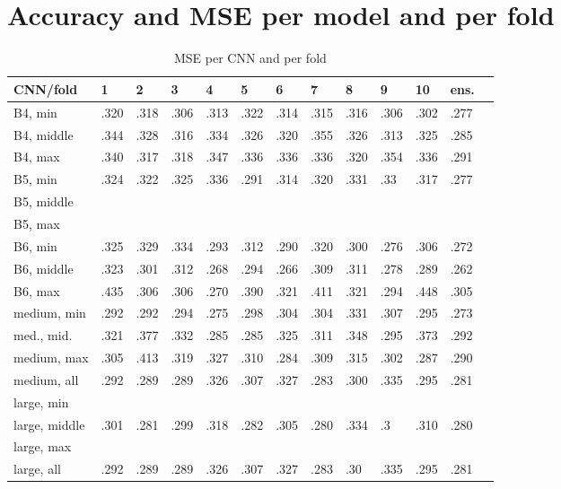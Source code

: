 \documentclass[10pt,letterpaper]{article}
\begin{document}
\section{\\Accuracy and MSE per model and per fold}

\begin{table}[!ht]
    \caption{MSE per CNN and per fold}
    \centering
    \begin{tabular}{|l|l|l|l|l|l|l|l|l|l|l|l|l|}
    \hline
        CNN/fold & 1 & 2 & 3 & 4 & 5 & 6 & 7 & 8 & 9 & 10 & ens. \\ \hline
        B4, min & .320 & .318 & .306 & .313 & .322 & .314 & .315 & .316 & .306 & .302 & .277 \\ \hline
        B4, middle & .344 & .328 & .316 & .334 & .326 & .320 & .355 & .326 & .313 & .325 & .285 \\ \hline
        B4, max & .340 & .317 & .318 & .347 & .336 & .336 & .336 & .320 & .354 & .336 & .291 \\ \hline
        B5, min & .324 & .322 & .325 & .336 & .291 & .314 & .320 & .331 & .33 & .317 & .277 \\ \hline
        B5, middle & ~ & ~ & ~ & ~ & ~ & ~ & ~ & ~ & ~ & ~ & ~ \\ \hline
        B5, max & ~ & ~ & ~ & ~ & ~ & ~ & ~ & ~ & ~ & ~ & ~ \\ \hline
        B6, min & .325 & .329 & .334 & .293 & .312 & .290 & .320 & .300 & .276 & .306 & .272 \\ \hline
        B6, middle & .323 & .301 & .312 & .268 & .294 & .266 & .309 & .311 & .278 & .289 & .262 \\ \hline
        B6, max & .435 & .306 & .306 & .270 & .390 & .321 & .411 & .321 & .294 & .448 & .305 \\ \hline
        medium, min & .292 & .292 & .294 & .275 & .298 & .304 & .304 & .331 & .307 & .295 & .273 \\ \hline
        med., mid. & .321 & .377 & .332 & .285 & .285 & .325 & .311 & .348 & .295 & .373 & .292 \\ \hline
        medium, max & .305 & .413 & .319 & .327 & .310 & .284 & .309 & .315 & .302 & .287 & .290 \\ \hline
        medium, all & .292 & .289 & .289 & .326 & .307 & .327 & .283 & .300 & .335 & .295 & .281 \\ \hline
        large, min & ~ & ~ & ~ & ~ & ~ & ~ & ~ & ~ & ~ & ~ & ~ \\ \hline
        large, middle & .301 & .281 & .299 & .318 & .282 & .305 & .280 & .334 & .3 & .310 & .280 \\ \hline
        large, max & ~ & ~ & ~ & ~ & ~ & ~ & ~ & ~ & ~ & ~ & ~ \\ \hline
        large, all & .292 & .289 & .289 & .326 & .307 & .327 & .283 & .30 & .335 & .295 & .281 \\ \hline
    \end{tabular}
\label{table8}    
\end{table}
\end{document}
